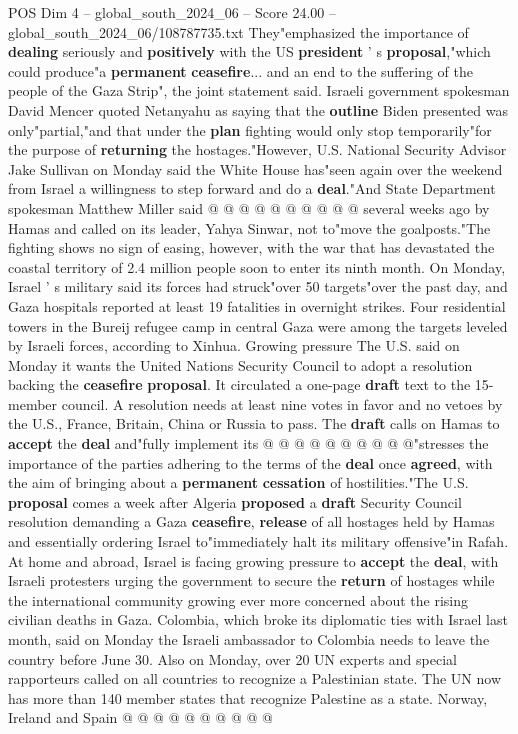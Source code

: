 \begin{textsample}{POS Dim 4 – global\_south\_2024\_06 – Score 24.00 – global\_south\_2024\_06/108787735.txt}
They"emphasized the importance of \textbf{dealing} seriously and \textbf{positively} with the US \textbf{president} ' s \textbf{proposal},"which could produce"a \textbf{permanent} \textbf{ceasefire}... and an end to the suffering of the people of the Gaza Strip", the joint statement said.
Israeli government spokesman David Mencer quoted Netanyahu as saying that the \textbf{outline} Biden presented was only"partial,"and that under the \textbf{plan} fighting would only stop temporarily"for the purpose of \textbf{returning} the hostages."However, U.S.
National Security Advisor Jake Sullivan on Monday said the White House has"seen again over the weekend from Israel a willingness to step forward and do a \textbf{deal}."And State Department spokesman Matthew Miller said @ @ @ @ @ @ @ @ @ @ several weeks ago by Hamas and called on its leader, Yahya Sinwar, not to"move the goalposts."The fighting shows no sign of easing, however, with the war that has devastated the coastal territory of 2.4 million people soon to enter its ninth month.
On Monday, Israel ' s military said its forces had struck"over 50 targets"over the past day, and Gaza hospitals reported at least 19 fatalities in overnight strikes.
Four residential towers in the Bureij refugee camp in central Gaza were among the targets leveled by Israeli forces, according to Xinhua.
Growing pressure The U.S. said on Monday it wants the United Nations Security Council to adopt a resolution backing the \textbf{ceasefire} \textbf{proposal}.
It circulated a one-page \textbf{draft} text to the 15-member council.
A resolution needs at least nine votes in favor and no vetoes by the U.S., France, Britain, China or Russia to pass.
The \textbf{draft} calls on Hamas to \textbf{accept} the \textbf{deal} and"fully implement its @ @ @ @ @ @ @ @ @ @"stresses the importance of the parties adhering to the terms of the \textbf{deal} once \textbf{agreed}, with the aim of bringing about a \textbf{permanent} \textbf{cessation} of hostilities."The U.S. \textbf{proposal} comes a week after Algeria \textbf{proposed} a \textbf{draft} Security Council resolution demanding a Gaza \textbf{ceasefire}, \textbf{release} of all hostages held by Hamas and essentially ordering Israel to"immediately halt its military offensive"in Rafah.
At home and abroad, Israel is facing growing pressure to \textbf{accept} the \textbf{deal}, with Israeli protesters urging the government to secure the \textbf{return} of hostages while the international community growing ever more concerned about the rising civilian deaths in Gaza.
Colombia, which broke its diplomatic ties with Israel last month, said on Monday the Israeli ambassador to Colombia needs to leave the country before June 30.
Also on Monday, over 20 UN experts and special rapporteurs called on all countries to recognize a Palestinian state.
The UN now has more than 140 member states that recognize Palestine as a state.
Norway, Ireland and Spain @ @ @ @ @ @ @ @ @ @

\end{textsample}
